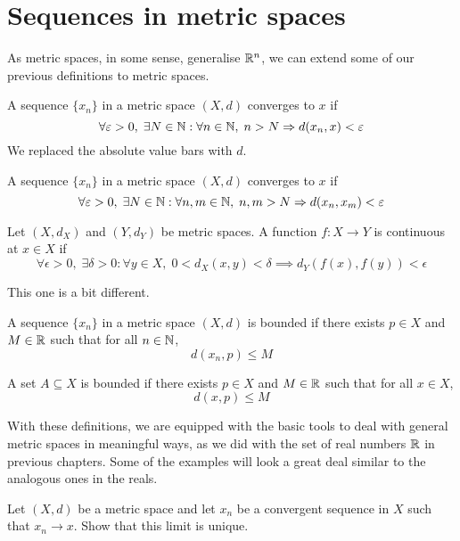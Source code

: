 
\section{Sequences in metric spaces}
As metric spaces, in some sense, generalise $\mathbb{R} ^ n$, we can extend some of our previous definitions to metric spaces.
\begin{definition}[Convergence]
  A sequence $\{ x_n \}$ in a metric space $(X, d)$ converges to $x$ if
  \[
    \forall \varepsilon > 0, \; \exists N \in \mathbb{N}: \forall n \in \mathbb{N}, \; n > N \Rightarrow d(x_n, x) < \varepsilon
  \]
  We replaced the absolute value bars with $d$.
\end{definition}
\begin{definition}
  A sequence $\{ x_n \}$ in a metric space $(X, d)$ converges to $x$ if
  \[
    \forall \varepsilon > 0, \; \exists N \in \mathbb{N}: \forall n, m \in \mathbb{N}, \; n, m > N \Rightarrow d(x_n, x_m) < \varepsilon
  \]
\end{definition}
\begin{definition}
  Let $(X, d_X)$ and $(Y, d_Y)$ be metric spaces. A function $f: X \to Y$ is continuous at $x \in X$ if
  \[
    \forall \epsilon > 0, \; \exists \delta > 0: \forall y \in X, \; 0 < d_X (x, y) < \delta \implies d_Y (f(x), f(y)) < \epsilon
  \]
\end{definition}
This one is a bit different.
\begin{definition}[Bounded]
  A sequence $\{ x_n \}$ in a metric space $(X, d)$ is bounded if there exists $p \in X$ and $M \in \mathbb{R}$ such that for all $n \in \mathbb{N}$,
  \[
    d(x_n, p) \leq M
  \]

  A set $A \subseteq X$ is bounded if there exists $p \in X$ and $M \in \mathbb{R}$ such that for all $x \in X$,
  \[
    d(x, p) \leq M
  \]
\end{definition}
With these definitions, we are equipped with the basic tools to deal with general metric spaces in meaningful ways, as we did with the set of real numbers $\mathbb{R}$ in previous chapters. Some of the examples will look a great deal similar to the analogous ones in the reals.
\begin{prop}
  Let $(X, d)$ be a metric space and let $x_n$ be a convergent sequence in $X$ such that $x_n \to x$. Show that this limit is unique.
\end{prop}
